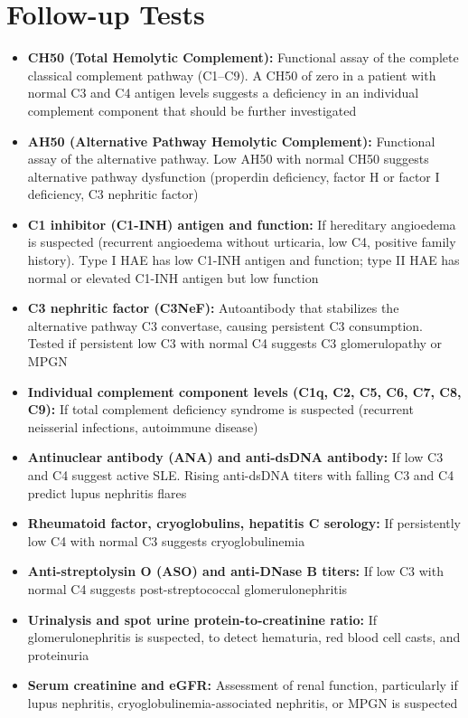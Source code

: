 \section*{Follow-up Tests}
\begin{itemize}
  \item \textbf{CH50 (Total Hemolytic Complement):} Functional assay of the complete classical complement pathway (C1--C9). A CH50 of zero in a patient with normal C3 and C4 antigen levels suggests a deficiency in an individual complement component that should be further investigated
  \item \textbf{AH50 (Alternative Pathway Hemolytic Complement):} Functional assay of the alternative pathway. Low AH50 with normal CH50 suggests alternative pathway dysfunction (properdin deficiency, factor H or factor I deficiency, C3 nephritic factor)
  \item \textbf{C1 inhibitor (C1-INH) antigen and function:} If hereditary angioedema is suspected (recurrent angioedema without urticaria, low C4, positive family history). Type I HAE has low C1-INH antigen and function; type II HAE has normal or elevated C1-INH antigen but low function
  \item \textbf{C3 nephritic factor (C3NeF):} Autoantibody that stabilizes the alternative pathway C3 convertase, causing persistent C3 consumption. Tested if persistent low C3 with normal C4 suggests C3 glomerulopathy or MPGN
  \item \textbf{Individual complement component levels (C1q, C2, C5, C6, C7, C8, C9):} If total complement deficiency syndrome is suspected (recurrent neisserial infections, autoimmune disease)
  \item \textbf{Antinuclear antibody (ANA) and anti-dsDNA antibody:} If low C3 and C4 suggest active SLE. Rising anti-dsDNA titers with falling C3 and C4 predict lupus nephritis flares
  \item \textbf{Rheumatoid factor, cryoglobulins, hepatitis C serology:} If persistently low C4 with normal C3 suggests cryoglobulinemia
  \item \textbf{Anti-streptolysin O (ASO) and anti-DNase B titers:} If low C3 with normal C4 suggests post-streptococcal glomerulonephritis
  \item \textbf{Urinalysis and spot urine protein-to-creatinine ratio:} If glomerulonephritis is suspected, to detect hematuria, red blood cell casts, and proteinuria
  \item \textbf{Serum creatinine and eGFR:} Assessment of renal function, particularly if lupus nephritis, cryoglobulinemia-associated nephritis, or MPGN is suspected
\end{itemize}

